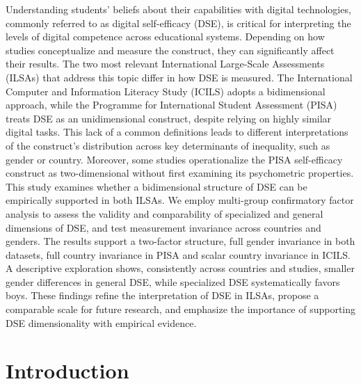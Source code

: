 \documentclass[
  letterpaper,
  DIV=11,
  numbers=noendperiod]{scrartcl}
\begin{document}
Understanding students' beliefs about their capabilities with digital
technologies, commonly referred to as digital self-efficacy (DSE), is
critical for interpreting the levels of digital competence across
educational systems. Depending on how studies conceptualize and measure
the construct, they can significantly affect their results. The two most
relevant International Large-Scale Assessments (ILSAs) that address this
topic differ in how DSE is measured. The International Computer and
Information Literacy Study (ICILS) adopts a bidimensional approach,
while the Programme for International Student Assessment (PISA) treats
DSE as an unidimensional construct, despite relying on highly similar
digital tasks. This lack of a common definitions leads to different
interpretations of the construct's distribution across key determinants
of inequality, such as gender or country. Moreover, some studies
operationalize the PISA self-efficacy construct as two-dimensional
without first examining its psychometric properties. This study examines
whether a bidimensional structure of DSE can be empirically supported in
both ILSAs. We employ multi-group confirmatory factor analysis to assess
the validity and comparability of specialized and general dimensions of
DSE, and test measurement invariance across countries and genders. The
results support a two-factor structure, full gender invariance in both
datasets, full country invariance in PISA and scalar country invariance
in ICILS. A descriptive exploration shows, consistently across countries
and studies, smaller gender differences in general DSE, while
specialized DSE systematically favors boys. These findings refine the
interpretation of DSE in ILSAs, propose a comparable scale for future
research, and emphasize the importance of supporting DSE dimensionality
with empirical evidence.

\section{Introduction}\label{introduction}
\end{document}
